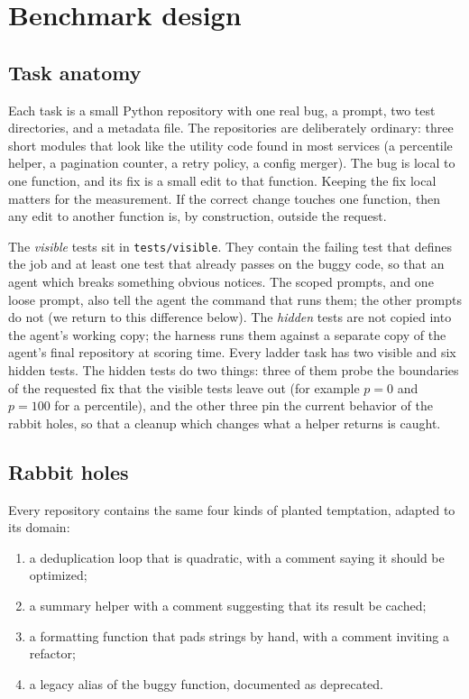 \section{Benchmark design}
\label{sec:method}

\subsection{Task anatomy}

Each task is a small Python repository with one real bug, a prompt, two test
directories, and a metadata file. The repositories are deliberately ordinary:
three short modules that look like the utility code found in most services
(a percentile helper, a pagination counter, a retry policy, a config merger).
The bug is local to one function, and its fix is a small edit to that
function. Keeping the fix local matters for the measurement. If the correct change touches one
function, then any edit to another function is, by construction, outside the
request.

The \emph{visible} tests sit in \texttt{tests/visible}. They contain the
failing test that defines the job and at least one test that already passes on
the buggy code, so that an agent which breaks something obvious notices. The
scoped prompts, and one loose prompt, also tell the agent the command that runs
them; the other prompts do not (we return to this difference below). The
\emph{hidden} tests are not copied into the agent's working copy; the harness
runs them against a separate copy of the agent's final repository at scoring
time. Every ladder task has two visible and six hidden tests. The
hidden tests do two things: three of them probe the boundaries of the requested
fix that the visible tests leave out (for example $p=0$ and $p=100$ for a
percentile), and the other three pin the current behavior of the rabbit
holes, so that a cleanup which changes what a helper returns is caught.

\subsection{Rabbit holes}

Every repository contains the same four kinds of planted temptation, adapted
to its domain:

\begin{enumerate}
  \item a deduplication loop that is quadratic, with a comment saying it
        should be optimized;
  \item a summary helper with a comment suggesting that its result be cached;
  \item a formatting function that pads strings by hand, with a comment
        inviting a refactor;
  \item a legacy alias of the buggy function, documented as deprecated.
\end{enumerate}

